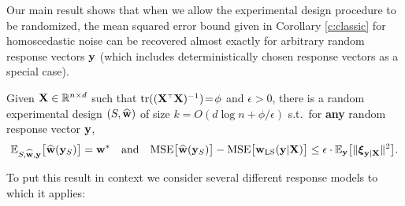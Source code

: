 \documentclass[12pt]{sty/colt2019/colt2018-arxiv}
\begin{document}
Our main result shows that when we allow the experimental design procedure to be randomized,
the mean squared error bound
given in Corollary \ref{c:classic} for homoscedastic noise can be
recovered almost exactly for arbitrary random response vectors $\mathbf y$ 
(which includes deterministically chosen response vectors as a special case).
\begin{theorem}\label{t:mse}
Given $\mathbf X\in\mathbb R^{n\times d}$ such that 
$\tr((\X^\top\X)^{-1})\!=\!\phi$ and $\epsilon>0$, there is a
random experimental design $(S,\widehat{\mathbf w})$
of size $k=O(d\log n+\phi/\epsilon)$ s.t.~for \textbf{any} random
response vector $\mathbf y$, 
\begin{align*}
\E_{S,\wbh,\y}\big[\wbh(\y_S)\big]=\w^*\quad\text{and}\quad
  \mathrm{MSE}\big[\wbh(\y_S)\big] - \mathrm{MSE}\big[\wols(\y|\X)\big]
  \leq \epsilon\cdot 
  \E_\y\big[\|\xib_{\y|\X}\|^2\big].%
\end{align*}
\end{theorem}
To put this result in context we consider several different response
models to which it applies:
\end{document}
